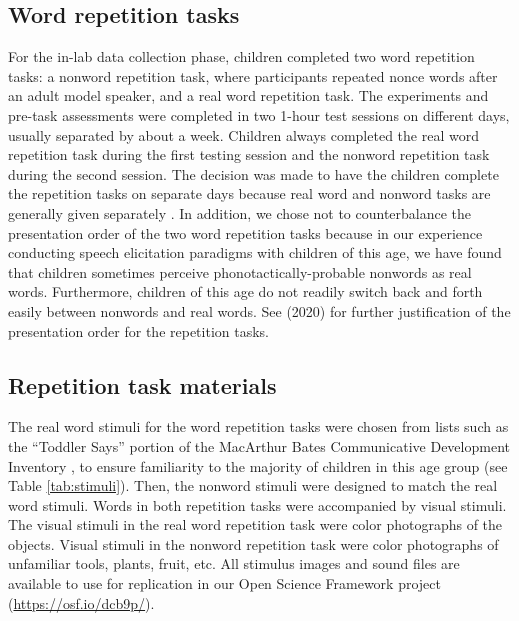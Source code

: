 \documentclass[a4paper,man,natbib,donotrepeattitle, apacite]{apa6}
\begin{document}
\subsection{Word repetition tasks}

For the in-lab data collection phase, children completed two word repetition tasks: a nonword repetition task, where participants repeated nonce words after an adult model speaker, and a real word repetition task. The experiments and pre-task assessments were completed in two 1-hour test sessions on different days, usually separated by about a week. Children always completed the real word repetition task during the first testing session and the nonword repetition task during the second session. The decision was made to have the children complete the repetition tasks on separate days because real word and nonword tasks are generally given separately \cite{chiatPreschoolRepetitionTest2007}. In addition, we chose not to counterbalance the presentation order of the two word repetition tasks because in our experience conducting speech elicitation paradigms with children of this age, we have found that children sometimes perceive phonotactically-probable nonwords as real words. Furthermore, children of this age do not readily switch back and forth easily between nonwords and real words. See \citeauthor{cychoszLexicalAdvantageFouryearold2020}(2020) for further justification of the presentation order for the repetition tasks. 

\subsection{Repetition task materials}

The real word stimuli for the word repetition tasks were chosen from lists such as the ``Toddler Says'' portion of the MacArthur Bates Communicative Development Inventory \cite{fensonMacArthurBatesCommunicativeDevelopment2007}, to ensure familiarity to the majority of children in this age group (see Table \ref{tab:stimuli}). Then, the nonword stimuli were designed to match the real word stimuli. Words in both repetition tasks were accompanied by visual stimuli. The visual stimuli in the real word repetition task were color photographs of the objects. Visual stimuli in the nonword repetition task were color photographs of unfamiliar tools, plants, fruit, etc. All stimulus images and sound files are available to use for replication in our Open Science Framework project (\url{https://osf.io/dcb9p/}). 
\end{document}
